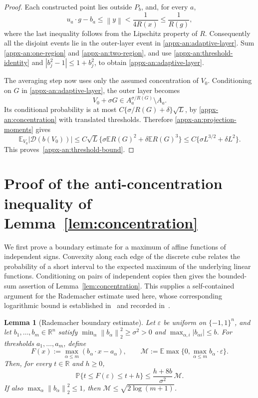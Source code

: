 \documentclass[11pt,letterpaper]{article}
\newtheorem{lemma}{Lemma}
\theoremstyle{remark}
\newcommand{\E}{\mathbb E}
\newcommand{\Pp}{\mathbb P}
\newcommand{\R}{\mathbb R}
\newcommand{\norm}[1]{\left\lVert#1\right\rVert}
\begin{document}
\begin{proof}
Each constructed point lies outside \(P_b\), and, for every \(a\),
\[
 u_a\cdot g-b_a\le\norm y<\frac1{4R(x)}\le\frac1{R(g)},
\]
where the last inequality follows from the Lipschitz property of $R$. 
Consequently all the disjoint events lie in the outer-layer event
in \eqref{appx-an:adaptive-layer}. Sum \eqref{appx-an:one-region} and
\eqref{appx-an:two-region}, and use \eqref{appx-an:threshold-identity} and
\(|b_j^2-1|\le1+b_j^2\), to obtain \eqref{appx-an:adaptive-layer}.

The averaging step now uses only the assumed concentration of \(V_0\).
Conditioning on \(G\) in \eqref{appx-an:adaptive-layer}, the outer layer becomes
\[
 V_0+\sigma G\in A_a^{\sigma/R(G)}\setminus A_a.
\]
Its conditional probability is at most
\(C\{\sigma/R(G)+\delta\}\sqrt L\), by \eqref{appx-an:concentration}
with translated thresholds. Therefore \eqref{appx-an:projection-moments}
gives
\[
 \E_{V_0}|\mathcal D(b(V_0))|
 \le C\sqrt L\{\sigma\E R(G)^2+\delta\E R(G)^3\}
 \le C\{\sigma L^{3/2}+\delta L^2\}.
\]
This proves~\eqref{appx-an:threshold-bound}.
\end{proof}

\section{\texorpdfstring{Proof of the anti-concentration inequality of Lemma~\ref{lem:concentration}}{Proof of the rectangle anti-concentration inequality}}\label{appx-app:concentration}
\label{appx-conc:conditioning}

We first prove a boundary estimate for a maximum of affine functions
of independent signs. Convexity along each edge of the discrete cube
relates the probability of a short interval to the expected maximum
of the underlying linear functions. Conditioning on pairs of independent
copies then gives the bounded-sum assertion of Lemma~\ref{lem:concentration}.
This supplies a self-contained argument for the Rademacher estimate
used here, whose corresponding logarithmic bound is established
in~\cite{OST} and recorded in~\cite[Lemma~J.4]{CCKK2022}.

\begin{lemma}[Rademacher boundary estimate]\label{appx-lem:cube-boundary}
Let \(\varepsilon\) be uniform on \(\{-1,1\}^n\), and let
\(b_1,\ldots,b_m\in\R^n\) satisfy
\(\min_\alpha\norm{b_\alpha}_2^2\ge\sigma^2>0\) and
\(\max_{\alpha,i}|b_{\alpha i}|\le b\).
For thresholds \(a_1,\ldots,a_m\), define
\[
 F(x):=\max_{\alpha\le m}(b_\alpha\cdot x-a_\alpha),
 \qquad
 \mathcal M:=\E\max\{0,\max_{\alpha\le m}b_\alpha\cdot\varepsilon\}.
\]
Then, for every \(t\in\R\) and \(h\ge0\),
\begin{equation}
 \Pp\{t\le F(\varepsilon)\le t+h\}
 \le\frac{h+8b}{\sigma^2}\,\mathcal M.
 \label{appx-eq:cube-boundary}
\end{equation}
If also \(\max_\alpha\norm{b_\alpha}_2^2\le1\), then
\(\mathcal M\le\sqrt{2\log(m+1)}\).
\end{lemma}
\end{document}
